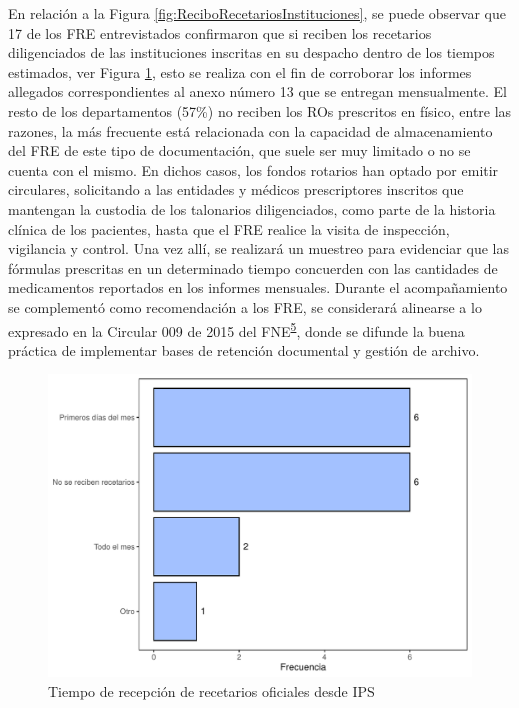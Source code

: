 \documentclass[
]{book}
\begin{document}
En relación a la Figura \ref{fig:ReciboRecetariosInstituciones}, se puede observar que 17 de los FRE entrevistados confirmaron que si reciben los recetarios diligenciados de las instituciones inscritas en su despacho dentro de los tiempos estimados, ver Figura \ref{fig:TiempoRecepcionRecOficiales}, esto se realiza con el fin de corroborar los informes allegados correspondientes al anexo número 13 que se entregan mensualmente. El resto de los departamentos (57\%) no reciben los ROs prescritos en físico, entre las razones, la más frecuente está relacionada con la capacidad de almacenamiento del FRE de este tipo de documentación, que suele ser muy limitado o no se cuenta con el mismo. En dichos casos, los fondos rotarios han optado por emitir circulares, solicitando a las entidades y médicos prescriptores inscritos que mantengan la custodia de los talonarios diligenciados, como parte de la historia clínica de los pacientes, hasta que el FRE realice la visita de inspección, vigilancia y control. Una vez allí, se realizará un muestreo para evidenciar que las fórmulas prescritas en un determinado tiempo concuerden con las cantidades de medicamentos reportados en los informes mensuales. Durante el acompañamiento se complementó como recomendación a los FRE, se considerará alinearse a lo expresado en la Circular 009 de 2015 del FNE\textsuperscript{\protect\hyperlink{ref-FNE2015-9}{5}}, donde se difunde la buena práctica de implementar bases de retención documental y gestión de archivo.

\begin{figure}
\includegraphics[width=0.85\linewidth]{InformeFinal_files/figure-latex/TiempoRecepcionRecOficiales-1} \caption{Tiempo de recepción de recetarios oficiales desde IPS}\label{fig:TiempoRecepcionRecOficiales}
\end{figure}
\end{document}
